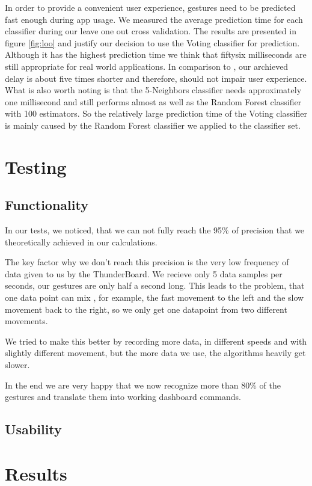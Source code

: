 In order to provide a convenient user experience, gestures need to be predicted fast enough during app usage. We measured the average prediction time for each classifier during our leave one out cross validation. The results are presented in figure \ref{fig:loo} and justify our decision to use the Voting classifier for prediction. Although it has the highest prediction time we think that fiftysix milliseconds are still appropriate for real world applications. In comparison to \cite{liu}, our archieved delay is about five times shorter and therefore, should not impair user experience. What is also worth noting is that the 5-Neighbors classifier needs approximately one millisecond and still performs almost as well as the Random Forest classifier with 100 estimators. So the relatively large prediction time of the Voting classifier is mainly caused by the Random Forest classifier we applied to the classifier set.


\chapter{Testing}
\label{ch:Tests}

\section{Functionality}
\label{ch:Results:sec:Functionality}

In our tests, we noticed, that we can not fully reach the 95\% of precision that we theoretically achieved in our calculations.

The key factor why we don't reach this precision is the very low frequency of data given to us by the ThunderBoard.
We recieve only 5 data samples per seconds, our gestures are only half a second long.
This leads to the problem, that one data point can mix , for example, the fast movement to the left and the slow movement back to the right, so we only get one datapoint from two different movements.

We tried to make this better by recording more data, in different speeds and with slightly different movement, but the more data we use, the algorithms heavily get slower.

In the end we are very happy that we now recognize more than 80\% of the gestures and translate them into working dashboard commands.


\section{Usability}
\label{ch:Results:sec:Usability}


\chapter{Results}
\label{ch:Results}

